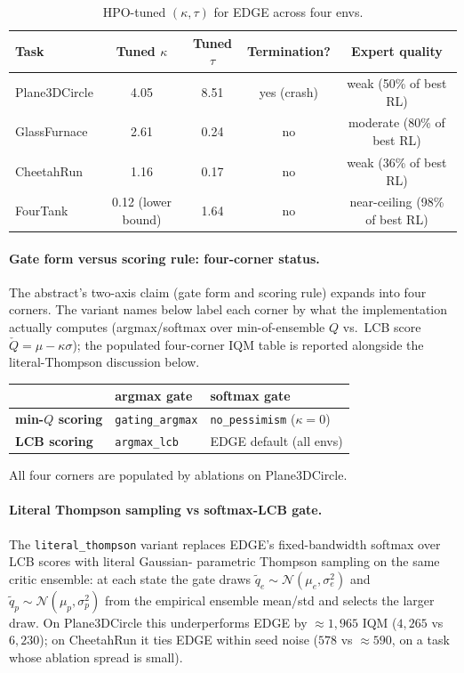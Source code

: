 \documentclass{article}
\begin{document}
\begin{table}[h]
\centering
\small
\begin{tabular}{lcccc}
\toprule
\textbf{Task} & \textbf{Tuned $\kappa$} & \textbf{Tuned $\tau$} & \textbf{Termination?} & \textbf{Expert quality} \\
\midrule
Plane3DCircle    & 4.05 & 8.51 & yes (crash) & weak (50\% of best RL) \\
GlassFurnace     & 2.61 & 0.24 & no          & moderate (80\% of best RL) \\
CheetahRun       & 1.16 & 0.17 & no          & weak (36\% of best RL) \\
FourTank         & 0.12 (lower bound) & 1.64 & no & near-ceiling (98\% of best RL) \\
\bottomrule
\end{tabular}
\caption{HPO-tuned $(\kappa, \tau)$ for EDGE across four envs.}
\label{tab:beta_per_task}
\end{table}

\paragraph{Gate form versus scoring rule: four-corner status.}
The abstract's two-axis claim (gate form and scoring rule) expands
into four corners. The variant names below label each corner by
what the implementation actually computes (argmax/softmax over
min-of-ensemble $Q$ vs.\ LCB score $\check Q = \mu - \kappa\sigma$);
the populated four-corner IQM table is reported alongside the
literal-Thompson discussion below.
\begin{center}
\small
\begin{tabular}{lll}
\toprule
& \textbf{argmax gate} & \textbf{softmax gate} \\
\midrule
\textbf{min-$Q$ scoring}   & \texttt{gating\_argmax}        & \texttt{no\_pessimism} ($\kappa{=}0$) \\
\textbf{LCB scoring}       & \texttt{argmax\_lcb}           & EDGE default (all envs)               \\
\bottomrule
\end{tabular}
\end{center}
All four corners are populated by ablations on Plane3DCircle.

\paragraph{Literal Thompson sampling vs softmax-LCB gate.}
The \texttt{literal\_thompson} variant replaces EDGE's
fixed-bandwidth softmax over LCB scores with literal Gaussian-
parametric Thompson sampling on the same critic ensemble: at each
state the gate draws $\tilde q_e \sim \mathcal{N}(\mu_e, \sigma_e^2)$
and $\tilde q_p \sim \mathcal{N}(\mu_p, \sigma_p^2)$ from the empirical
ensemble mean/std and selects the larger draw. On Plane3DCircle this
underperforms EDGE by $\approx 1{,}965$ IQM ($4{,}265$ vs $6{,}230$);
on CheetahRun it ties EDGE within seed noise ($578$ vs $\approx 590$,
on a task whose ablation spread is small).
\end{document}
